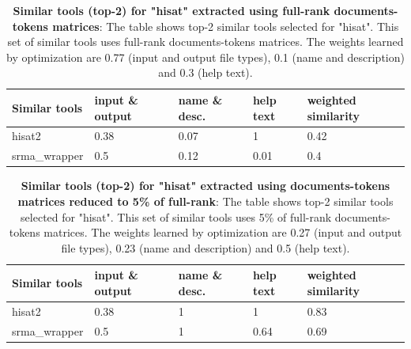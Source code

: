 \begin{table}[ht]
\begin{center}
    \begin{tabular}{|l|l|l|l|l|}
        \hline
        Similar tools & input \& output & name \& desc. & help text & weighted similarity \\ \hline
        hisat2   & 0.38 & 0.07 & 1 & 0.42  \\ \hline
        srma\_wrapper & 0.5 & 0.12 & 0.01 & 0.4 \\ \hline
    \end{tabular}
    \end{center}
    \caption[Similar tools (top-2) for "hisat" extracted using full-rank documents-tokens matrices]{\textbf{Similar tools (top-2) for "hisat" extracted using full-rank documents-tokens matrices}: The table shows top-2 similar tools selected for "hisat". This set of similar tools uses full-rank documents-tokens matrices. The weights learned by optimization are 0.77 (input and output file types), 0.1 (name and description) and 0.3 (help text). }
    \label{tab:accuracy}
\end{table}

\begin{table}[ht]
\begin{center}
    \begin{tabular}{|l|l|l|l|l|}
        \hline
        Similar tools   & input \& output & name \& desc. & help text & weighted similarity \\ \hline
        hisat2   & 0.38 & 1 & 1 & 0.83 \\ \hline
        srma\_wrapper & 0.5 & 1 & 0.64 & 0.69 \\ \hline
    \end{tabular}
    \end{center}
    \caption[Similar tools (top-2) for "hisat" extracted using documents-tokens matrices reduced to 5\% of full-rank]{\textbf{Similar tools (top-2) for "hisat" extracted using documents-tokens matrices reduced to 5\% of full-rank}: The table shows top-2 similar tools selected for "hisat". This set of similar tools uses 5\% of full-rank documents-tokens matrices. The weights learned by optimization are 0.27 (input and output file types), 0.23 (name and description) and 0.5 (help text).}
    \label{tab:accuracy}
\end{table}

